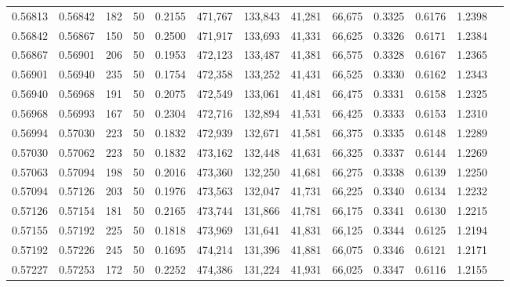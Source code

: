 \begin{tabular}{rrrrrrrrrrrrr}
0.56813 & 0.56842 &   182 &  50 &                                     0.2155 & 471,767 & 133,843 &  41,281 &  66,675 & 0.3325 & 0.6176 & 1.2398 \\
0.56842 & 0.56867 &   150 &  50 &                                     0.2500 & 471,917 & 133,693 &  41,331 &  66,625 & 0.3326 & 0.6171 & 1.2384 \\
0.56867 & 0.56901 &   206 &  50 &                                     0.1953 & 472,123 & 133,487 &  41,381 &  66,575 & 0.3328 & 0.6167 & 1.2365 \\
0.56901 & 0.56940 &   235 &  50 &                                     0.1754 & 472,358 & 133,252 &  41,431 &  66,525 & 0.3330 & 0.6162 & 1.2343 \\
0.56940 & 0.56968 &   191 &  50 &                                     0.2075 & 472,549 & 133,061 &  41,481 &  66,475 & 0.3331 & 0.6158 & 1.2325 \\
0.56968 & 0.56993 &   167 &  50 &                                     0.2304 & 472,716 & 132,894 &  41,531 &  66,425 & 0.3333 & 0.6153 & 1.2310 \\
0.56994 & 0.57030 &   223 &  50 &                                     0.1832 & 472,939 & 132,671 &  41,581 &  66,375 & 0.3335 & 0.6148 & 1.2289 \\
0.57030 & 0.57062 &   223 &  50 &                                     0.1832 & 473,162 & 132,448 &  41,631 &  66,325 & 0.3337 & 0.6144 & 1.2269 \\
0.57063 & 0.57094 &   198 &  50 &                                     0.2016 & 473,360 & 132,250 &  41,681 &  66,275 & 0.3338 & 0.6139 & 1.2250 \\
0.57094 & 0.57126 &   203 &  50 &                                     0.1976 & 473,563 & 132,047 &  41,731 &  66,225 & 0.3340 & 0.6134 & 1.2232 \\
0.57126 & 0.57154 &   181 &  50 &                                     0.2165 & 473,744 & 131,866 &  41,781 &  66,175 & 0.3341 & 0.6130 & 1.2215 \\
0.57155 & 0.57192 &   225 &  50 &                                     0.1818 & 473,969 & 131,641 &  41,831 &  66,125 & 0.3344 & 0.6125 & 1.2194 \\
0.57192 & 0.57226 &   245 &  50 &                                     0.1695 & 474,214 & 131,396 &  41,881 &  66,075 & 0.3346 & 0.6121 & 1.2171 \\
0.57227 & 0.57253 &   172 &  50 &                                     0.2252 & 474,386 & 131,224 &  41,931 &  66,025 & 0.3347 & 0.6116 & 1.2155 \\

\end{tabular}
